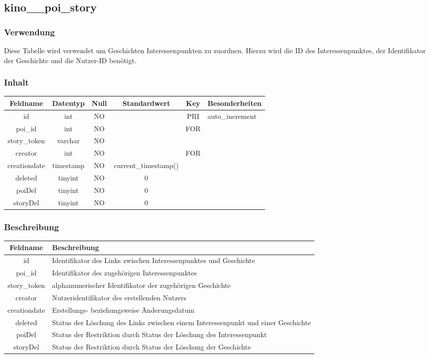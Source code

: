 \subsection{kino\_\_poi\_story}
\subsubsection{Verwendung} Diese Tabelle wird verwendet um Geschichten Interessenpunkten zu zuordnen. Hierzu wird die ID des Interessenpunktes, der Identifikator der Geschichte und die Nutzer-ID benötigt.
\subsubsection{Inhalt}
\begin{table}[H]
	\begin{tabular}{|c|c|c|c|c|p{3.5cm}|}
		\hline
		\textbf{Feldname} & \textbf{Datentyp} & \textbf{Null} & \textbf{Standardwert} & \textbf{Key}   & \textbf{Besonderheiten} \\ \hline
		id & int & NO &  & PRI & auto\_increment \\ \hline
		poi\_id & int & NO &  & FOR & \\ \hline
		story\_token & varchar & NO &  &  & \\ \hline
		creator & int & NO &  & FOR & \\ \hline
		creationdate & timestamp & NO & current\_timestamp() &  & \\ \hline
		deleted & tinyint & NO & 0 &  & \\ \hline
		poiDel & tinyint & NO & 0 &  & \\ \hline
		storyDel & tinyint & NO & 0 &  & \\ \hline
	\end{tabular}
\end{table}
\subsubsection{Beschreibung}
\begin{table}[H]
	\begin{tabular}{|c|p{12cm}|}
		\hline
		\textbf{Feldname} & \textbf{Beschreibung} \\ \hline
		id & Identifikator des Links zwischen Interessenpunktes und Geschichte \\ \hline
		poi\_id & Identifikator des zugehörigen Interessenpunktes\\ \hline
		story\_token & alphanumerischer Identifikator der zugehörigen Geschichte \\ \hline
		creator & Nutzeridentifikator des erstellenden Nutzers \\ \hline
		creationdate & Erstellungs- beziehungsweise Änderungsdatum \\ \hline
		deleted & Status der Löschung des Links zwischen einem Interessenpunkt und einer Geschichte \\ \hline
		poiDel & Status der Restriktion durch Status der Löschung des Interessenpunkt \\ \hline
		storyDel & Status der Restriktion durch Status der Löschung der Geschichte \\ \hline
	\end{tabular}
\end{table}
